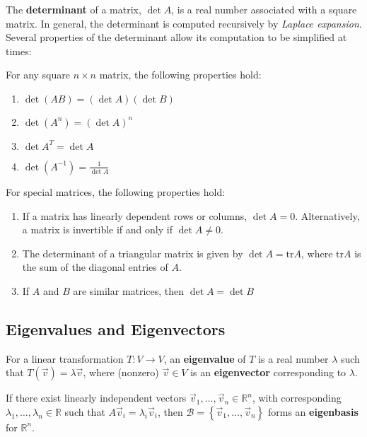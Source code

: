 The \textbf{determinant} of a matrix, $\det A$, is a real number associated with a square matrix. In general, the determinant is computed recursively by \textit{Laplace expansion}. Several properties of the determinant allow its computation to be simplified at times:

\begin{shaded}

For any square $n\times n$ matrix, the following properties hold:

\begin{enumerate}
    \item $\det (AB) = (\det A) (\det B)$
    \item $\det (A^n) = (\det A)^n$
    \item $\det A^T = \det A$
    \item $\det (A^{-1}) = \frac{1}{\det A}$
\end{enumerate}

For special matrices, the following properties hold:

\begin{enumerate}
    \item If a matrix has linearly dependent rows or columns, $\det A = 0$. Alternatively, a matrix is invertible if and only if $\det A \neq 0$.
    \item The determinant of a triangular matrix is given by $\det A = \text{tr}A$, where $\text{tr}A$ is the sum of the diagonal entries of $A$.
    \item If $A$ and $B$ are similar matrices, then $\det A = \det B$
\end{enumerate}

\end{shaded}

\subsection{Eigenvalues and Eigenvectors}

For a linear transformation $T:V\to V$, an \textbf{eigenvalue} of $T$ is a real number $\lambda$ such that $T(\vec{v})=\lambda \vec{v}$, where (nonzero) $\vec{v}\in V$ is an \textbf{eigenvector} corresponding to $\lambda$.

If there exist linearly independent vectors $\vec{v}_1,\dots,\vec{v}_n\in\mathbb{R}^n$, with corresponding $\lambda_1,\dots,\lambda_n\in\mathbb{R}$ such that $A\vec{v}_i = \lambda_i\vec{v}_i$, then $\mathcal{B}=\left\{\vec{v}_1,\dots,\vec{v}_n\right\}$ forms an \textbf{eigenbasis} for $\mathbb{R}^n$.

